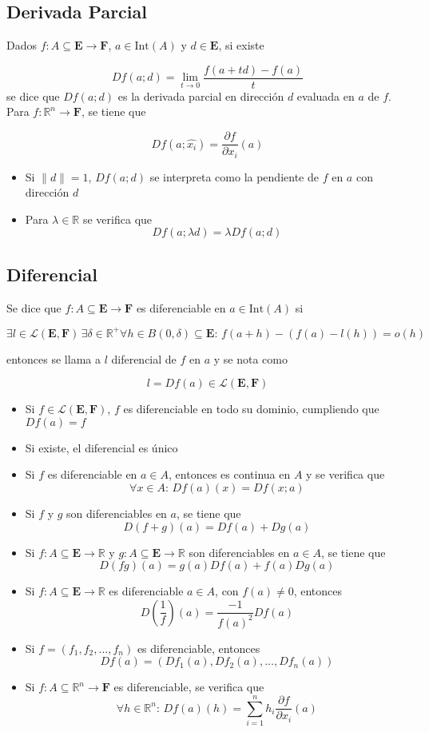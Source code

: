 \subsection{Derivada Parcial}

Dados $f:A\subseteq\mathbf{E}\to\mathbf{F}$, $a\in\mathrm{Int}(A)$ y $d\in\mathbf{E}$, si existe

\[Df(a;d)=\lim_{t\to 0}\frac{f(a+td)-f(a)}{t}\]
\bigbreak
se dice que $Df(a;d)$ es la derivada parcial en dirección $d$ evaluada en $a$ de $f$.
\bigbreak
Para $f:\mathbb{R}^n\to\mathbf{F}$, se tiene que

\[Df(a;\hat{x_i})=\frac{\partial f}{\partial x_i}(a)\]
\bigbreak
\begin{itemize}
    \item Si $\|d\|=1$, $Df(a;d)$ se interpreta como la pendiente de $f$ en $a$ con dirección $d$
    \item Para $\lambda\in\mathbb{R}$ se verifica que
    \[Df(a;\lambda d)=\lambda Df(a;d)\]
\end{itemize}

\subsection{Diferencial}

Se dice que $f:A\subseteq\mathbf{E}\to\mathbf{F}$ es diferenciable en $a\in\mathrm{Int}(A)$ si

\[\exists l\in\mathcal{L}(\mathbf{E},\mathbf{F})\,
\exists\delta\in\mathbb{R}^+
\forall h\in B(0,\delta)\subseteq\mathbf{E}:\,
f(a+h)-(f(a)-l(h))=o(h)\]

entonces se llama a $l$ diferencial de $f$ en $a$ y se nota como

\[l=Df(a)\in\mathcal{L}(\mathbf{E},\mathbf{F})\]
\bigbreak
\begin{itemize}
    \item Si $f\in\mathcal{L}(\mathbf{E},\mathbf{F})$, $f$ es diferenciable en todo su dominio, cumpliendo que $Df(a) = f$
    \item Si existe, el diferencial es único
    \item Si $f$ es diferenciable en $a\in A$, entonces es continua en $A$ y se verifica que
    \[\forall x\in A:\,Df(a)(x) = Df(x;a)\]
    \item Si $f$ y $g$ son diferenciables en $a$, se tiene que
    \[D(f+g)(a)=Df(a)+Dg(a)\]
    \item Si $f:A\subseteq\mathbf{E}\to\mathbb{R}$ y $g:A\subseteq\mathbf{E}\to\mathbb{R}$ son diferenciables en $a\in A$, se tiene que
    \[D(fg)(a)=g(a)Df(a)+f(a)Dg(a)\]
    \item Si $f:A\subseteq\mathbf{E}\to\mathbb{R}$ es diferenciable $a\in A$, con $f(a)\neq 0$, entonces
    \[D\left(\frac{1}{f}\right)(a)=\frac{-1}{f(a)^2}Df(a)\]
    \item Si $f = (f_1, f_2, ..., f_n)$ es diferenciable, entonces
    \[Df(a)= (Df_1(a), Df_2(a), ..., Df_n(a))\]
    \item Si $f:A\subseteq\mathbb{R}^n\to\mathbf{F}$ es diferenciable, se verifica que
    \[\forall  h\in\mathbb{R}^n:\, Df(a)(h) =
    \sum^n_{i=1}h_i\frac{\partial f}{\partial x_i}(a)\]
\end{itemize}

